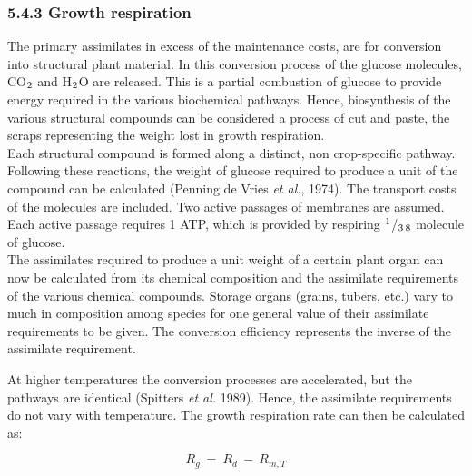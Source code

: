 \documentclass[11pt]{article}
\begin{document}
\bigskip
\bigskip

\subsubsection{  5.4.3 Growth respiration  }

The primary assimilates in excess of the maintenance costs, are for conversion into
structural plant material. In this conversion process of the glucose molecules, CO$_{{\rm 2}}$ and
H$_{{\rm 2}}$O are released. This is a partial combustion of glucose to provide energy required in
the various biochemical pathways. Hence, biosynthesis of the various structural com\-pounds can be considered a process of cut and paste, the scraps representing the weight
lost in growth respiration.\\
 Each structural compound is formed along a distinct, non crop-specific pathway.
Following these reactions, the weight of glucose required to produce a unit of the
compound can be calculated (Penning de Vries {\it et al.\/}, 1974). The transport costs of the
molecules are included. Two active passages of membranes are assumed. Each active
passage requires 1 ATP, which is provided by respiring $^{{\rm 1}}$/$_{{\rm 3}}$$_{{\rm 8}}$ molecule of glucose. \\
The assimilates required to produce a unit weight of a certain plant organ can now be
calculated from its chemical composition and the assimilate requirements of the various
chemical com\-pounds. Storage organs (grains, tubers, etc.) vary to much in composition
among species for one general value of their assimilate requirements to be given. The
conversion efficiency represents the inverse of the assimilate require\-ment.

At higher temperatures the conversion processes are accelerated, but the pathways are
identical (Spitters {\it et al.\/} 1989). Hence, the assimilate requirements do not vary with
temperature. The growth respiration rate can then be calculated as:

\begin{displaymath}
R _{g} ~=~ R _{d} ~-~ R _{m,T} 
\end{displaymath}
\end{document}

